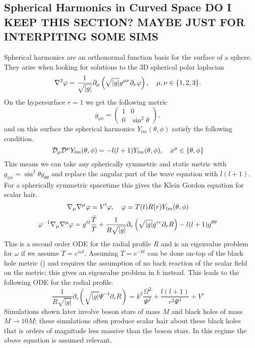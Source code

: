  \subsection{Spherical Harmonics in Curved Space DO I KEEP THIS SECTION? MAYBE JUST FOR INTERPITING SOME SIMS}
 Spherical harmonics are an orthonormal function basis for the surface of a sphere. They arise when looking for solutions to the 3D spherical polar laplacian
 \begin{equation} \nabla^2 \varphi= \frac{1}{\sqrt{|g|}}\partial_{\mu}\left( \sqrt{|g|}g^{\mu\nu}\partial_\nu \varphi\right), \quad \mu,\nu \in \{1,2,3\} .\end{equation}
 On the hypersurface $r=1$ we get the following metric
 \begin{equation} g_{\mu\nu} = \begin{pmatrix} 1 & 0 \\ 0 & \sin^2 \theta\end{pmatrix},\end{equation}
 and on this surface the spherical harmonics $Y_{lm}(\theta,\phi)$ satisfy the following condition.
 \begin{equation} \mathcal{D}_\mu \mathcal{D}^\mu Y_{lm}(\theta,\phi) = -l(l+1)Y_{lm}(\theta,\phi), \quad x^\mu \in \{\theta,\phi\}\end{equation} 
 This means we can take any spherically symmetric and static metric with $g_{\phi\phi} = \sin^2\theta g_{\theta\theta}$ and replace the angular part of the wave equation with $l(l+1)$. For a spherically symmetric spacetime this gives the Klein Gordon equation for scalar hair.
 \begin{equation} \nabla_\mu \nabla^\mu \varphi = V' \varphi, \quad \varphi = T(t)R(r)Y_{lm}(\theta,\phi)\end{equation}
 \begin{equation}\varphi^{-1}\nabla_\mu \nabla^\mu \varphi = g^{tt}\frac{\ddot{T}}{T} +  \frac{1}{R\sqrt{|g|}}\partial_{r}\left( \sqrt{|g|}g^{rr}\partial_r R\right) -{l(l+1)}g^{\theta\theta} \end{equation}
 This is a second order ODE for the radial profile $R$ and is an eigenvalue problem for $\omega$ if we assume $T=e^{i\omega t}$. Assuming $T=e^{-kt}$ can be done on-top of the black hole metric () and requires the assumption of no back reaction of the scalar field on the metric; this gives an eigenvalue problem in $k$ instead. This leads to the following ODE for the radial profile. 
 \begin{equation} \frac{1}{R\sqrt{|g|}}\partial_{r}\left( \sqrt{|g|}\Psi^{-4}\partial_r R\right)  = k^2 \frac{\Omega^2}{\Psi^2} + \frac{l(l+1)}{r^2 \Psi^4} + V'\end{equation}
Simulations shown later involve boson stars of mass $M$ and black holes of mass $M\rightarrow 10M$; these simulations often produce scalar hair about these black holes that is orders of magnitude less massive than the boson stars. In this regime the above equation is assumed relevant.


